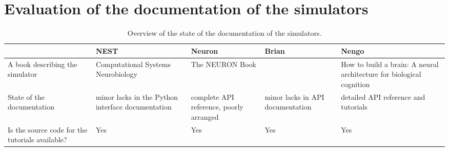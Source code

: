 \chapter{Evaluation of the documentation of the simulators}
\label{appendix:c}
\begin{table}[htbp]
    \centering
    \begin{sideways}
        \begin{tabularx}{0.7\textheight}{*{5}{>{\raggedright\arraybackslash}X}}
            \toprule
             & NEST & Neuron & Brian & Nengo \\
            \midrule
            A book describing the simulator & Computational Systems Neurobiology \cite{lenovereComputationalSystemsNeurobiology2012}
            & The NEURON Book \cite{carnevaleNEURONBook06} & & How to build a brain: A neural architecture for biological cognition \cite{eliasmithHowBuild13} \\
            State of the documentation & minor lacks in the Python interface documentation & complete API reference, poorly arranged & minor lacks in API documentation & detailed API reference and tutorials \\
            Is the source code for the tutorials available? & Yes & Yes & Yes & Yes \\
            \bottomrule
        \end{tabularx}
    \end{sideways}
    \caption{Overview of the state of the documentation of the simulators.}
\end{table}